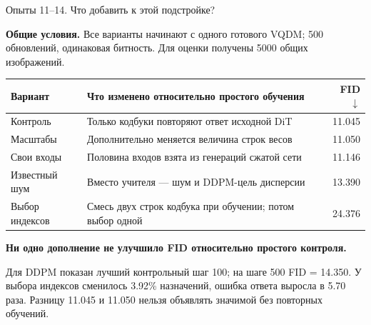 \documentclass[aspectratio=1610,11pt]{beamer}
\renewcommand{\fact}[2]{\par\textcolor{Accent}{\textbf{#1.}} #2\par}
\newcommand{\finding}[1]{\par\vspace{.5mm}\textbf{#1}\par}
\newcommand{\detail}[1]{{\fontsize{10}{12}\selectfont #1\par}}
\newenvironment{datatable}{\par\begingroup\fontsize{10.5}{12.5}\selectfont\setlength{\tabcolsep}{4pt}\renewcommand{\arraystretch}{1.2}}{\par\endgroup}
\begin{document}
\begin{frame}[t]{Опыты 11--14. Что добавить к этой подстройке?}
  \fact{Общие условия}{Все варианты начинают с одного готового VQDM;
  500 обновлений, одинаковая битность. Для оценки получены 5000 общих изображений.}
  \begin{datatable}
    \begin{tabularx}{\textwidth}{@{}L{.22\textwidth}Xr@{}}
      \toprule
      Вариант & Что изменено относительно простого обучения & FID $\downarrow$\\
      \midrule
      Контроль & Только кодбуки повторяют ответ исходной DiT & 11.045\\
      Масштабы & Дополнительно меняется величина строк весов & 11.050\\
      Свои входы & Половина входов взята из генераций сжатой сети & 11.146\\
      Известный шум & Вместо учителя --- шум и DDPM-цель дисперсии & 13.390\\
      Выбор индексов & Смесь двух строк кодбука при обучении; потом выбор одной & 24.376\\
      \bottomrule
    \end{tabularx}
  \end{datatable}
  \finding{Ни одно дополнение не улучшило FID относительно простого контроля.}
  \detail{Для DDPM показан лучший контрольный шаг 100; на шаге 500 FID = 14.350.
  У выбора индексов сменилось 3.92\% назначений, ошибка ответа выросла в 5.70 раза.
  Разницу 11.045 и 11.050 нельзя объявлять значимой без повторных обучений.}
\end{frame}
\end{document}
